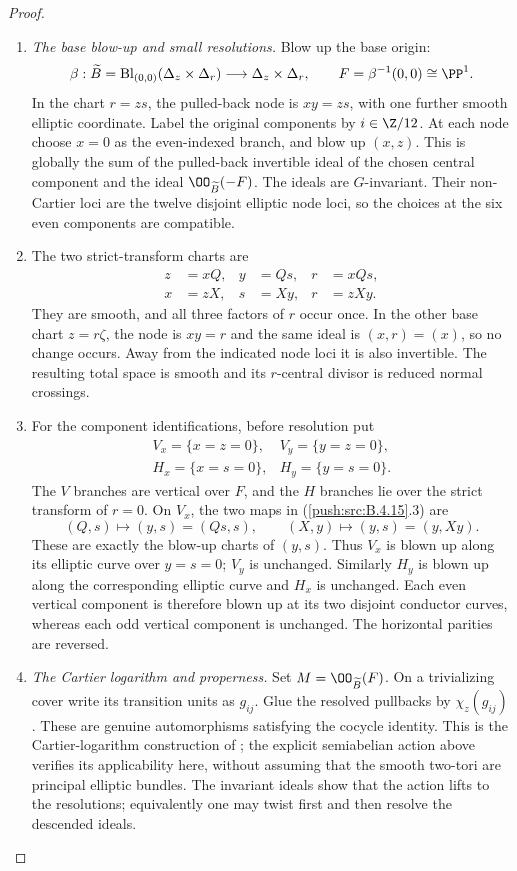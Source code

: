 \begin{proof}
\begin{enumerate}[label=\arabic*.,leftmargin=*]
\item \emph{The base blow-up and small resolutions.}
Blow up the base origin:
\[
 \beta:\widetilde B=\operatorname{Bl}_{(0,0)}
            (\Delta_z\times\Delta_r)
       \longrightarrow\Delta_z\times\Delta_r,
 \qquad F=\beta^{-1}(0,0)\cong\PP^1.
\]
In the chart $r=zs$, the pulled-back node is
$xy=zs$, with one further smooth elliptic coordinate.
Label the original components by $i\in\Z/12$.
At each node choose $x=0$ as the even-indexed branch,
and blow up $(x,z)$. This is globally the sum of the
pulled-back invertible ideal of the chosen central
component and the ideal $\OO_{\widetilde B}(-F)$.
The ideals are $G$-invariant. Their non-Cartier loci are
the twelve disjoint elliptic node loci, so the choices
at the six even components are compatible.

\item The two strict-transform charts are
\[
 \begin{aligned}
 z&=xQ,&y&=Qs,&r&=xQs,\\
 x&=zX,&s&=Xy,&r&=zXy.
 \end{aligned}
 \tag{B.4.15.3}
\]
They are smooth, and all three factors of $r$ occur once.
In the other base chart $z=r\zeta$, the node is $xy=r$
and the same ideal is $(x,r)=(x)$, so no change occurs.
Away from the indicated node loci it is also invertible.
The resulting total space is smooth and its $r$-central
divisor is reduced normal crossings.

\item For the component identifications, before resolution put
\[
 \begin{array}{ll}
 V_x=\{x=z=0\},&V_y=\{y=z=0\},\\
 H_x=\{x=s=0\},&H_y=\{y=s=0\}.
 \end{array}
\]
The $V$ branches are vertical over $F$, and the $H$
branches lie over the strict transform of $r=0$.
On $V_x$, the two maps in (\ref{push:src:B.4.15}.3) are
\[
 (Q,s)\longmapsto(y,s)=(Qs,s),\qquad
 (X,y)\longmapsto(y,s)=(y,Xy).
\]
These are exactly the blow-up charts of $(y,s)$.
Thus $V_x$ is blown up along its elliptic curve over
$y=s=0$; $V_y$ is unchanged. Similarly $H_y$ is blown
up along the corresponding elliptic curve and $H_x$
is unchanged. Each even vertical component is therefore
blown up at its two disjoint conductor curves, whereas
each odd vertical component is unchanged. The horizontal
parities are reversed.

\item \emph{The Cartier logarithm and properness.}
Set $M=\OO_{\widetilde B}(F)$. On a trivializing cover
write its transition units as $g_{ij}$. Glue the resolved
pullbacks by $\chi_z(g_{ij})$. These are genuine
automorphisms satisfying the cocycle identity.
This is the Cartier-logarithm construction of
\citet[Definition~1.1]{Fujimoto1990AB}; the explicit
semiabelian action above verifies its applicability
here, without assuming that the smooth two-tori are
principal elliptic bundles. The invariant ideals show
that the action lifts to the resolutions; equivalently
one may twist first and then resolve the descended ideals.


\end{enumerate}
\end{proof}
